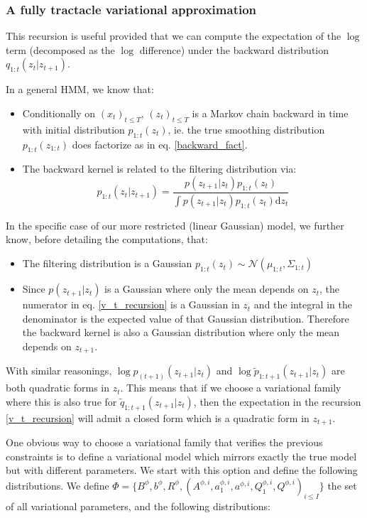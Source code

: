 \documentclass{article}
\newcommand{\1}{\mathbbm{1}}
\newcommand{\rmd}{\ensuremath{\mathrm{d}}}
\newcommand{\gaussian}[2]{\mathcal{N}\left( #1, #2 \right)}
\newcommand{\vbackward}[1]{q_{1:#1}(z_{#1}|z_{#1 + 1})}
\begin{document}
\subsubsection*{A fully tractacle variational approximation}
This recursion is useful provided that we can compute the expectation of the $\log$ term (decomposed as the $\log$ difference) under the backward distribution $\vbackward{t}$. 

In a general HMM, we know that:

\begin{itemize}
    \item Conditionally on $(x_t)_{t \leq T}$, $(z_t)_{t \leq T}$ is a Markov chain backward in time with initial distribution $p_{1:t}(z_t)$, ie. the true smoothing distribution $p_{1:t}(z_{1:t})$ does factorize as in eq. \ref{backward_fact}.
    \item The backward kernel is related to the filtering distribution via: $$p_{1:t}(z_t|z_{t+1}) = \frac{p(z_{t+1}|z_t)p_{1:t}(z_t)}{\int p(z_{t+1}|z_t)p_{1:t}(z_t)\rmd z_t}$$
\end{itemize} 

In the specific case of our more restricted (linear Gaussian) model, we further know, before detailing the computations, that:

\begin{itemize}
    \item The filtering distribution is a Gaussian $p_{1:t}(z_t) \sim \gaussian{\mu_{1:t}}{\Sigma_{1:t}}$
    \item Since $p(z_{t+1}|z_t)$ is a Gaussian where only the mean depends on $z_t$, the numerator in eq. \ref{v_t_recursion} is a Gaussian in $z_t$ and the integral in the denominator is the expected value of that Gaussian distribution. Therefore the backward kernel is also a Gaussian distribution where only the mean depends on $z_{t+1}$. 
\end{itemize} 

With similar reasonings, $\log p_{(t+1)}(z_{t+1}|z_t)$ and $\log \tilde{p}_{1:t+1}(z_{t+1}|z_t)$ are both quadratic forms in $z_t$. This means that if we choose a variational family where this is also true for $\tilde{q}_{1:t+1}(z_{t+1}|z_t)$, then the expectation in the recursion \ref{v_t_recursion} will admit a closed form which is a quadratic form in $z_{t+1}$.
                                                    
One obvious way to choose a variational family that verifies the previous constraints is to define a variational model which mirrors exactly the true model but with different parameters. We start with this option and define the following distributions. We define $\Phi = \{B^\phi, b^\phi, R^\phi, (A^{\phi,i}, a_1^{\phi,i}, a^{\phi,i}, Q_1^{\phi,i}, Q^{\phi,i})_{i \leq I}\}$ the set of all variational parameters, and the following distributions:
\end{document}
